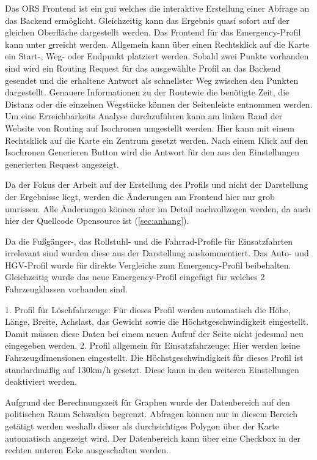 \documentclass[12pt,a4paper]{article}
\begin{document}
Das ORS Frontend ist ein \gls{gui} welches die interaktive Erstellung einer Abfrage an das Backend ermöglicht. Gleichzeitig kann das Ergebnis quasi sofort auf der gleichen Oberfläche  dargestellt werden. Das Frontend für das Emergency-Profil kann unter \href{www.emergency.openrouteservice.org} erreicht werden.
Allgemein kann über einen Rechtsklick auf die Karte ein Start-, Weg- oder Endpunkt platziert werden. Sobald zwei Punkte vorhanden sind wird ein Routing Request für das ausgewählte Profil an das Backend gesendet und die erhaltene Antwort als schnellster Weg zwischen den Punkten dargestellt. Genauere Informationen zu der Routewie die benötigte Zeit, die Distanz oder die einzelnen Wegstücke können der Seitenleiste entnommen werden.
Um eine Erreichbarkeits Analyse durchzuführen kann am linken Rand der Website von Routing auf Isochronen umgestellt werden. Hier kann mit einem Rechtsklick auf die Karte ein Zentrum gesetzt werden. Nach einem Klick auf den Isochronen Generieren Button wird die Antwort für den aus den Einstellungen generierten Request angezeigt.

Da der Fokus der Arbeit auf der Erstellung des Profils und nicht der Darstellung der Ergebnisse liegt, werden die Änderungen am Frontend hier nur grob umrissen. Alle Änderungen können aber im Detail nachvollzogen werden, da auch hier der Quellcode Opensource ist (\ref{sec:anhang}).

Da die Fußgänger-, das Rollstuhl- und die Fahrrad-Profile für Einsatzfahrten irrelevant sind wurden diese aus der Darstellung auskommentiert. Das Auto- und HGV-Profil wurde für direkte Vergleiche zum Emergency-Profil beibehalten.
Gleichzeitig wurde das neue Emergency-Profil eingefügt für welches 2 Fahrzeugklassen vorhanden sind.

1. Profil für Löschfahrzeuge: Für dieses Profil werden automatisch die Höhe, Länge, Breite, Achslast, das Gewicht sowie die Höchstgeschwindigkeit eingestellt. Damit müssen diese Daten bei einem neuen Aufruf der Seite nicht jedesmal neu eingegeben werden. 
2. Profil allgemein für Einsatzfahrzeuge: Hier werden keine Fahrzeugdimensionen eingestellt. Die Höchstgeschwindigkeit für dieses Profil ist standardmäßig auf 130km/h gesetzt. Diese kann in den weiteren Einstellungen deaktiviert werden.

Aufgrund der Berechnungszeit für Graphen wurde der Datenbereich auf den politischen Raum Schwaben begrenzt. Abfragen können nur in diesem Bereich getätigt werden weshalb dieser als durchsichtiges Polygon über der Karte automatisch angezeigt wird. Der Datenbereich kann über eine Checkbox in der rechten unteren Ecke ausgeschalten werden.
\end{document}
